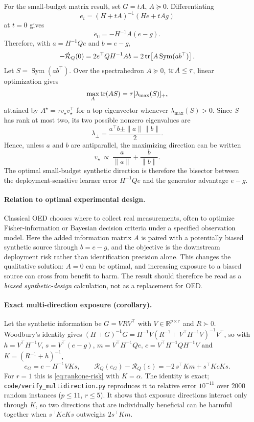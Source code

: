 For the small-budget matrix result, set $G=tA$, $A\succeq0$. Differentiating
\[
e_t=(H+tA)^{-1}(He+tAg)
\]
at $t=0$ gives
\[
\dot e_0=-H^{-1}A(e-g).
\]
Therefore, with $a=H^{-1}Qe$ and $b=e-g$,
\[
-\dot{\mathcal R}_Q(0)
=2e^\top QH^{-1}Ab
=2\operatorname{tr}\!\left[A\operatorname{Sym}(ab^\top)\right].
\]
Let $S=\operatorname{Sym}(ab^\top)$. Over the spectrahedron $A\succeq0$, $\operatorname{tr} A\le\tau$, linear optimization gives
\[
\max_A\operatorname{tr}(AS)=\tau[\lambda_{\max}(S)]_+,
\]
attained by $A^\star=\tau v_\star v_\star^\top$ for a top eigenvector whenever $\lambda_{\max}(S)>0$. Since $S$ has rank at most two, its two possible nonzero eigenvalues are
\[
\lambda_\pm=\frac{a^\top b\pm\|a\|\|b\|}{2}.
\]
Hence, unless $a$ and $b$ are antiparallel, the maximizing direction can be written
\[
v_\star\ \propto\ \frac{a}{\|a\|}+\frac{b}{\|b\|}.
\]
The optimal small-budget synthetic direction is therefore the bisector between the deployment-sensitive learner error $H^{-1}Qe$ and the generator advantage $e-g$.

\paragraph{Relation to optimal experimental design.}
Classical OED chooses where to collect real measurements, often to optimize Fisher-information or Bayesian decision criteria under a specified observation model. Here the added information matrix $A$ is paired with a potentially biased synthetic source through $b=e-g$, and the objective is the downstream deployment risk rather than identification precision alone. This changes the qualitative solution: $A=0$ can be optimal, and increasing exposure to a biased source can cross from benefit to harm. The result should therefore be read as a \emph{biased synthetic-design} calculation, not as a replacement for OED.

\paragraph{Exact multi-direction exposure (corollary).}
Let the synthetic information be $G=VRV^\top$ with $V\in\mathbb R^{p\times r}$ and $R\succ0$. Woodbury's identity gives $(H+G)^{-1}G=H^{-1}V(R^{-1}+V^\top H^{-1}V)^{-1}V^\top$, so with $h=V^\top H^{-1}V$, $s=V^\top(e-g)$, $m=V^\top H^{-1}Qe$, $c=V^\top H^{-1}QH^{-1}V$ and $K=(R^{-1}+h)^{-1}$,
\[
e_G=e-H^{-1}VKs,\qquad \mathcal R_Q(e_G)-\mathcal R_Q(e)=-2\,s^\top Km+s^\top KcKs .
\]
For $r=1$ this is \eqref{eq:rankone-risk} with $K=\alpha$. The identity is exact; \texttt{code/verify\_multidirection.py} reproduces it to relative error $10^{-11}$ over 2000 random instances ($p\le11$, $r\le5$). It shows that exposure directions interact only through $K$, so two directions that are individually beneficial can be harmful together when $s^\top KcKs$ outweighs $2s^\top Km$.

